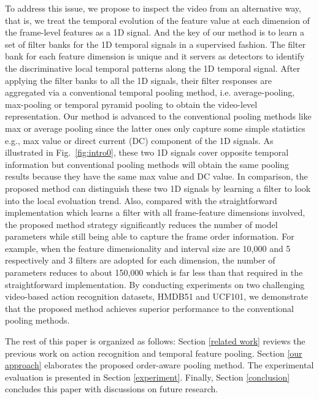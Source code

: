 \documentclass[journal]{IEEEtran}
\begin{document}
To address this issue, we propose to inspect the video from an alternative way, that is, we treat the temporal evolution of the feature value at each dimension of the frame-level features as a 1D signal. And the key of our method is to learn a set of filter banks for the 1D temporal signals in a supervised fashion. The filter bank for each feature dimension is unique and it servers as detectors to identify the discriminative local temporal patterns along the 1D temporal signal. After applying the filter banks to all the 1D signals, their filter responses are aggregated via a conventional temporal pooling method, i.e. average-pooling, max-pooling or temporal pyramid pooling to obtain the video-level representation.
%
Our method is advanced to the conventional pooling methods like max or average pooling since the latter ones only capture some simple statistics e.g., max value or direct current (DC) component of the 1D signals. As illustrated in Fig.~\ref{fig:intro0}, these two 1D signals cover opposite temporal information but conventional pooling methods will obtain the same pooling results because they have the same max value and DC value. In comparison, the proposed method can distinguish these two 1D signals by learning a filter to look into the local evoluation trend. Also, compared with the straightforward implementation which learns a filter with all frame-feature dimensions involved, the proposed method strategy significantly reduces the number of model parameters while still being able to capture the frame order information. For example, when the feature dimensionality and interval size are 10,000 and 5 respectively and 3 filters are adopted for each dimension, the number of parameters reduces to about 150,000 which is far less than that required in the  straightforward implementation. By conducting experiments on two challenging video-based action recognition datasets, HMDB51 and UCF101, we demonstrate that the proposed method achieves superior performance to the conventional pooling methods.

The rest of this paper is organized as follows: Section \ref{related work} reviews the previous work on action recognition and temporal feature pooling. Section \ref{our approach} elaborates the proposed order-aware pooling method. The experimental evaluation is presented in Section \ref{experiment}. Finally, Section \ref{conclusion} concludes this paper with discussions on future research.
\end{document}
